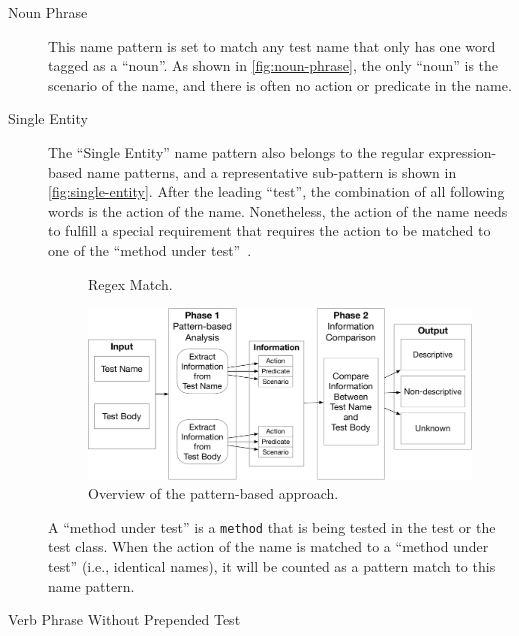 \documentclass[proposal.tex]{subfiles}
\begin{document}
\begin{description}
\item[Noun Phrase]


This name pattern is set to match any test name that only has one word tagged as a \enquote{noun}.
%
As shown in \cref{fig:noun-phrase}, the only \enquote{noun} is the scenario of the name, and there is often no action or predicate in the name.


\item[Single Entity]

The \enquote{Single Entity} name pattern also belongs to the regular expression-based name patterns, and a representative sub-pattern is shown in \cref{fig:single-entity}.
%
After the leading \enquote{test}, the combination of all following words is the action of the name.
%
Nonetheless, the action of the name needs to fulfill a special requirement that requires the action to be matched to one of the \enquote{method under test}~\cite{zhang2016towards}.

\begin{figure}[t]
\centering
    \begin{subfigure}{0.675\textwidth}
    \end{subfigure}
\caption{Regex Match.}
\label{fig:regex-match}
\end{figure}

\begin{figure}[H]
  \centering
  \includegraphics[scale=0.25]{figures/overview_of_approach.pdf}
  \caption{Overview of the pattern-based approach.}
  \label{fig:approach}
\end{figure}

A \enquote{method under test} is a \texttt{method} that is being tested in the test or the test class.
%
When the action of the name is matched to a \enquote{method under test} (i.e., identical names), it will be counted as a pattern match to this name pattern.


\item[Verb Phrase Without Prepended Test]


\end{description}
\end{document}
